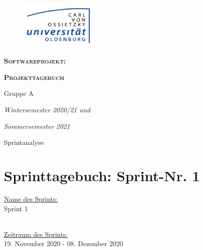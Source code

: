 \documentclass[12pt,a4paper, oneside]{article}
\author{Uni Oldenburg, SWP2020 Gruppe A}
\begin{document}
    \begin{titlepage}
        \pagestyle{empty}
        \begin{center}

            \begin{figure}[h]
                \centering
                \includegraphics[width=0.35\textwidth]{../img/Logo.jpg}
            \end{figure}

            \bigskip \bigskip \noindent
            \textsc{\textbf{\LARGE Softwareprojekt:}} \par \bigskip \noindent
            \textsc{\textbf{\LARGE Projekttagebuch}}


            \par \bigskip \bigskip \bigskip \bigskip \bigskip \noindent
            {\Large Gruppe A} \par \medskip \noindent

            \par \bigskip \bigskip \bigskip \bigskip \bigskip \bigskip \noindent
            \textit{\Large Wintersemester 2020/21 und} \par \noindent
            \textit{\Large Sommersemester 2021}

            \par \bigskip \bigskip \bigskip \bigskip \bigskip \bigskip \noindent
            \par \bigskip \bigskip \bigskip \noindent
            {\Large Sprintanalyse} \par \medskip \noindent

        \end{center}
    \end{titlepage}

    \tableofcontents
    \pagebreak



    \section{Sprinttagebuch: Sprint-Nr. 1}
    \underline{Name des Sprints:}
    \\
    Sprint 1

    \noindent
    \\
    \underline{Zeitraum des Sprints:}
    \\
    19. November 2020 - 08. Dezember 2020
\end{document}
